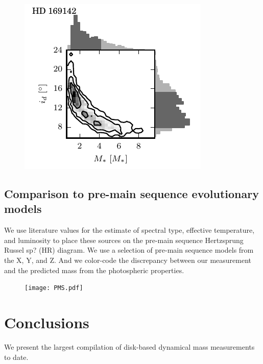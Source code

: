 \documentclass{aastex6}
\begin{document}
\begin{figure}[htb]
\begin{center}
\includegraphics{HD169142_posterior.pdf}
\end{center}
\end{figure}

\subsection{Comparison to pre-main sequence evolutionary models}

We use literature values for the estimate of spectral type, effective temperature, and luminosity to place these sources on the pre-main sequence Hertzsprung Russel sp? (HR) diagram. We use a selection of pre-main sequence models from the X, Y, and Z. And we color-code the discrepancy between our measurement and the predicted mass from the photospheric properties.

\begin{figure}[htb]
\begin{center}
  \texttt{[image: PMS.pdf]}
  \end{center}
\end{figure}


\section{Conclusions}

We present the largest compilation of disk-based dynamical mass measurements to date.
\end{document}
